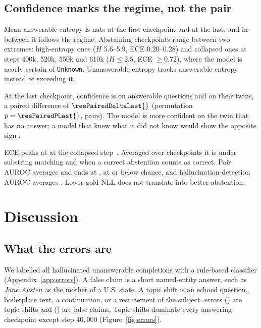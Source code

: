 \documentclass[11pt]{article}
\begin{document}
\subsection{Confidence marks the regime, not the pair}

Mean answerable entropy is \resEntropyFirst{} nats at the first checkpoint and \resEntropyLast{} at the last, and in between it follows the regime. Abstaining checkpoints range between two extremes: high-entropy ones ($H$ 5.6--5.9, ECE 0.20--0.28) and collapsed ones at steps 400k, 520k, 550k and 610k ($H\le 2.5$, ECE $\ge 0.72$), where the model is nearly certain of \texttt{Unknown}. Unanswerable entropy tracks answerable entropy instead of exceeding it.

At the last checkpoint, confidence is \resConfAnsLast{} on answerable questions and \resConfUnLast{} on their twins, a paired difference of $\resPairedDeltaLast{}$ (permutation $p=\resPairedPLast{}$, \resNumAnswerable{} pairs). The model is more confident on the twin that has no answer; a model that knew what it did not know would show the opposite sign \citep{kadavath2022know,yin2023unknown}.

ECE peaks at \resECEMax{} at the collapsed step~\resECEMaxStep{}. Averaged over checkpoints it is \resECESubMean{} under substring matching and \resECEJointMean{} when a correct abstention counts as correct. Pair AUROC averages \resAUROCPairMean{} and ends at \resAUROCPairLast{}, at or below chance, and hallucination-detection AUROC averages \resAUROCDetectMean{}. Lower gold NLL does not translate into better abstention.

\section{Discussion}

\subsection{What the errors are}
\label{sec:errors}

We labelled all \resErrorNHallucinated{} hallucinated unanswerable completions with a rule-based classifier (Appendix~\ref{app:errors}). A false claim is a short named-entity answer, such as \emph{Jane Austen} as the mother of a U.S. state. A topic shift is an echoed question, boilerplate text, a continuation, or a restatement of the subject. \resErrorNTopicShift{} errors (\resErrorTopicShiftShare{}) are topic shifts and \resErrorNFalseClaim{} (\resErrorFalseClaimShare{}) are false claims. Topic shifts dominate every answering checkpoint except step $40{,}000$ (Figure~\ref{fig:errors}).
\end{document}
